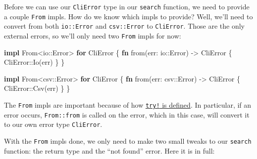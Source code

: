 \documentclass[a4paper,]{book}
\newenvironment{Shaded}{\begin{snugshade}}{\end{snugshade}}
\newcommand{\KeywordTok}[1]{\textcolor[rgb]{0.13,0.29,0.53}{\textbf{{#1}}}}
\newcommand{\NormalTok}[1]{{#1}}
\begin{document}
Before we can use our \texttt{CliError} type in our \texttt{search}
function, we need to provide a couple \texttt{From} impls. How do we
know which impls to provide? Well, we'll need to convert from both
\texttt{io::Error} and \texttt{csv::Error} to \texttt{CliError}. Those
are the only external errors, so we'll only need two \texttt{From} impls
for now:

\begin{Shaded}
\begin{Highlighting}[]
\KeywordTok{impl} \NormalTok{From<io::Error> }\KeywordTok{for} \NormalTok{CliError \{}
    \KeywordTok{fn} \NormalTok{from(err: io::Error) -> CliError \{}
        \NormalTok{CliError::Io(err)}
    \NormalTok{\}}
\NormalTok{\}}

\KeywordTok{impl} \NormalTok{From<csv::Error> }\KeywordTok{for} \NormalTok{CliError \{}
    \KeywordTok{fn} \NormalTok{from(err: csv::Error) -> CliError \{}
        \NormalTok{CliError::Csv(err)}
    \NormalTok{\}}
\NormalTok{\}}
\end{Highlighting}
\end{Shaded}

The \texttt{From} impls are important because of how
\protect\hyperlink{code-try-def}{\texttt{try!} is defined}. In
particular, if an error occurs, \texttt{From::from} is called on the
error, which in this case, will convert it to our own error type
\texttt{CliError}.

With the \texttt{From} impls done, we only need to make two small tweaks
to our \texttt{search} function: the return type and the ``not found''
error. Here it is in full:
\end{document}
